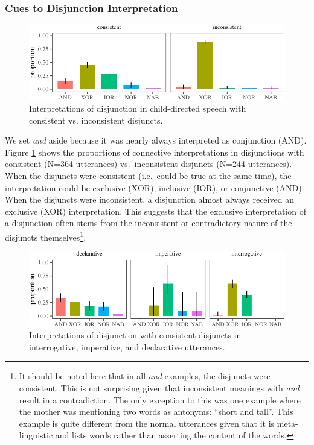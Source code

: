 \documentclass[
  ,man,floatsintext]{apa6}
\begin{document}
\hypertarget{cues-to-disjunction-interpretation}{%
\subsubsection{Cues to Disjunction Interpretation}\label{cues-to-disjunction-interpretation}}

\begin{figure}[H]

{\centering \includegraphics{figs/consistencyPlot-1} 

}

\caption{Interpretations of disjunction in child-directed speech with consistent vs. inconsistent disjuncts.}\label{fig:consistencyPlot}
\end{figure}

We set \emph{and} aside because it was nearly always interpreted as conjunction (AND). Figure \ref{fig:consistencyPlot} shows the proportions of connective interpretations in disjunctions with consistent (N=364 utterances) vs.~inconsistent disjuncts (N=244 utterances). When the disjuncts were consistent (i.e.~could be true at the same time), the interpretation could be exclusive (XOR), inclusive (IOR), or conjunctive (AND). When the disjuncts were inconsistent, a disjunction almost always received an exclusive (XOR) interpretation. This suggests that the exclusive interpretation of a disjunction often stems from the inconsistent or contradictory nature of the disjuncts themselves\footnote{It should be noted here that in all \emph{and}-examples, the disjuncts were consistent. This is not surprising given that inconsistent meanings with \emph{and} result in a contradiction. The only exception to this was one example where the mother was mentioning two words as antonyms: ``short and tall''. This example is quite different from the normal utterances given that it is meta-linguistic and lists words rather than asserting the content of the words.}.

\begin{figure}[H]

{\centering \includegraphics{figs/utterancePlot-1} 

}

\caption{Interpretations of disjunction with consistent disjuncts in interrogative, imperative, and declarative utterances.}\label{fig:utterancePlot}
\end{figure}
\end{document}
